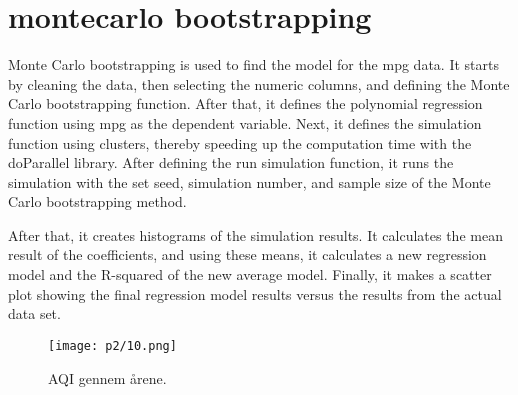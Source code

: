 

\section{montecarlo bootstrapping }

Monte Carlo bootstrapping is used to find the model for the mpg data. It starts by cleaning the data, then selecting the numeric columns, and defining the Monte Carlo bootstrapping function. After that, it defines the polynomial regression function using mpg as the dependent variable. Next, it defines the simulation function using clusters, thereby speeding up the computation time with the doParallel library. After defining the run simulation function, it runs the simulation with the set seed, simulation number, and sample size of the Monte Carlo bootstrapping method.

After that, it creates histograms of the simulation results. It calculates the mean result of the coefficients, and using these means, it calculates a new regression model and the R-squared of the new average model. Finally, it makes a scatter plot showing the final regression model results versus the results from the actual data set.
%

\begin{figure}[h] 
	\centering
	\texttt{[image: p2/10.png]}
	\caption{AQI gennem årene.}
	\label{fig:j06}
\end{figure}

